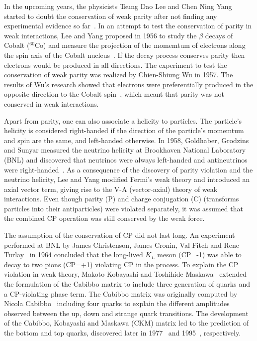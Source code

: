 In the upcoming years, the physicists Tsung Dao Lee and Chen Ning Yang started to doubt the conservation of weak parity after not finding any experimental evidence so far~\cite{LeeYang}. In an attempt to test the conservation of parity in weak interactions, Lee and Yang proposed in 1956 to study the $\beta$ decays of Cobalt (${}^{60}$Co) and measure the projection of the momemtum of electrons along the spin axis of the Cobalt nucleus~\cite{LeeYang}. If the decay process conserves parity then electrons would be produced in all directions. The experiment to test the conservation of weak parity was realized by Chien-Shiung Wu in 1957. The results of Wu's research showed that electrons were preferentially produced in the opposite direction to the Cobalt spin~\cite{WuParityViolation}, which meant that parity was not conserved in weak interactions.

Apart from parity, one can also associate a helicity to particles. The particle's helicity is considered right-handed if the direction of the particle's momemtum and spin are the same, and left-handed otherwise. In 1958, Goldhaber, Grodzins and Sunyar measured the neutrino helicity at Brookhaven National Laboratory (BNL) and discovered that neutrinos were always left-handed and antineutrinos were right-handed~\cite{NeutrinoHelicity}. As a consequence of the discovery of parity violation and the neutrino helicity, Lee and Yang modified Fermi's weak theory and introduced an axial vector term, giving rise to the V-A (vector-axial) theory of weak interactions. Even though parity (P) and charge conjugation (C) (transforms particles into their antiparticles) were violated separately, it was assumed that the combined CP operation was still conserved by the weak force.

The assumption of the conservation of CP did not last long. An experiment performed at BNL by James Christenson, James Cronin, Val Fitch and Rene Turlay~\cite{KMeson} in 1964 concluded that the long-lived $K_{L}$ meson (CP=-1) was able to decay to two pions (CP=+1) violating CP in the process. To explain the CP violation in weak theory, Makoto Kobayashi and Toshihide Maskawa~\cite{CKMMatrix} extended the formulation of the Cabibbo matrix to include three generation of quarks and a CP-violating phase term. The Cabibbo matrix was originally computed by Nicola Cabibbo~\cite{CabibboMatrix} including four quarks to explain the different amplitudes observed between the up, down and strange quark transitions. The development of the Cabibbo, Kobayashi and Maskawa (CKM) matrix led to the prediction of the bottom and top quarks, discovered later in 1977~\cite{BottomQuarkDiscovery} and 1995~\cite{TopQuarkDiscovery}, respectively.


